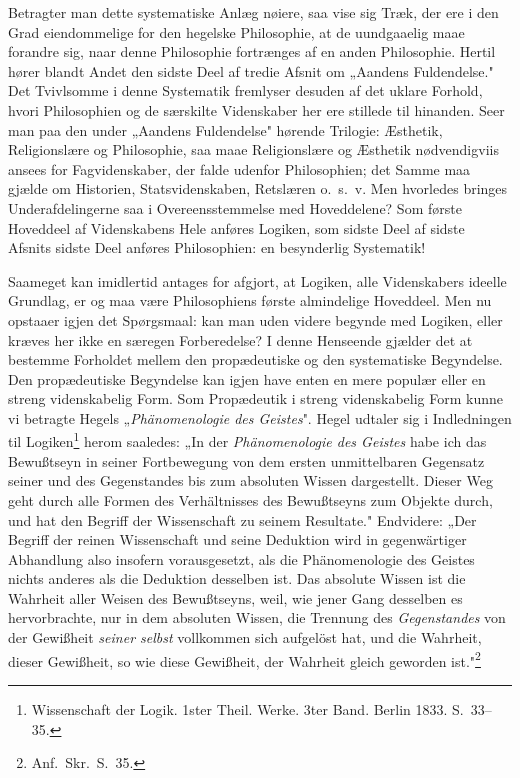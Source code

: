 \documentclass[12pt]{book}
\begin{document}
Betragter man dette systematiske Anlæg nøiere, saa vise sig Træk, der ere i den
Grad eiendommelige for den hegelske Philosophie, at de uundgaaelig maae forandre
sig, naar denne Philosophie fortrænges af en anden Philosophie. Hertil hører
blandt Andet den sidste Deel af tredie Afsnit om „Aandens Fuldendelse." Det
Tvivlsomme i denne Systematik fremlyser desuden af det uklare Forhold, hvori
Philosophien og de særskilte Videnskaber her ere stillede til hinanden. Seer man
paa den under „Aandens Fuldendelse" hørende Trilogie: Æsthetik, Religionslære og
Philosophie, saa maae Religionslære og Æsthetik nødvendigviis ansees
for Fagvidenskaber, der falde udenfor Philosophien; det Samme maa gjælde om
Historien, Statsvidenskaben, Retslæren o.\ s.\ v. Men hvorledes bringes
Underafdelingerne saa i Overeensstemmelse med Hoveddelene? Som første Hoveddeel af
Videnskabens Hele anføres Logiken, som sidste Deel af sidste Afsnits sidste Deel
anføres Philosophien: en besynderlig Systematik!

Saameget kan imidlertid antages for afgjort, at Logiken, alle Videnskabers ideelle
Grundlag, er og maa være Philosophiens første almindelige Hoveddeel. Men nu
opstaaer igjen det Spørgsmaal: kan man uden videre begynde med Logiken, eller
kræves her ikke en særegen Forberedelse? I denne Henseende gjælder det at bestemme
Forholdet mellem den propædeutiske og den systematiske Begyndelse. Den
propædeutiske Begyndelse kan igjen have enten en mere populær eller en streng
videnskabelig Form. Som Propædeutik i streng videnskabelig Form kunne vi betragte
Hegels „\emph{Phänomenologie des Geistes}". Hegel udtaler sig i Indledningen til
Logiken\footnote{Wissenschaft der Logik. 1ster Theil. Werke. 3ter Band. Berlin
1833. S.~33--35.} herom saaledes: „In der \emph{Phänomenologie des Geistes} habe
ich das Bewußtseyn in seiner Fortbewegung von dem ersten unmittelbaren Gegensatz
seiner und des Gegenstandes bis zum absoluten Wissen dargestellt. Dieser Weg geht
durch alle Formen des Verhältnisses des Bewußtseyns zum Objekte durch, und hat den
Begriff der Wissenschaft zu seinem Resultate." Endvidere: „Der Begriff der reinen
Wissenschaft und seine Deduktion wird in gegenwärtiger Abhandlung also insofern
vorausgesetzt, als die Phänomenologie des Geistes nichts anderes als die Deduktion
desselben ist. Das absolute Wissen ist die Wahrheit aller Weisen des Bewußtseyns,
weil, wie jener
Gang desselben es hervorbrachte, nur in dem absoluten Wissen, die Trennung des
\emph{Gegenstandes} von der Gewißheit \emph{seiner selbst} vollkommen sich
aufgelöst hat, und die Wahrheit, dieser Gewißheit, so wie diese Gewißheit, der
Wahrheit gleich geworden ist."\footnote{Anf.\ Skr.\ S.~35.}
\end{document}
